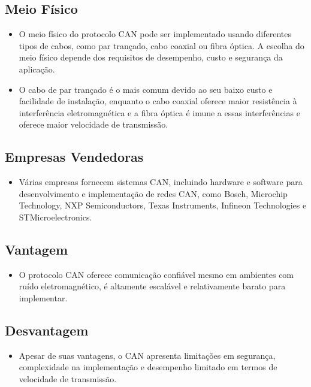 \documentclass[a4paper,11pt]{article} %
\begin{document}
\subsection{Meio Físico}
\begin{itemize}
    \item O meio físico do protocolo CAN pode ser implementado usando diferentes tipos de cabos, como par trançado, cabo coaxial ou fibra óptica. A escolha do meio físico depende dos requisitos de desempenho, custo e segurança da aplicação.
    \item O cabo de par trançado é o mais comum devido ao seu baixo custo e facilidade de instalação, enquanto o cabo coaxial oferece maior resistência à interferência eletromagnética e a fibra óptica é imune a essas interferências e oferece maior velocidade de transmissão.
\end{itemize}

\subsection{Empresas Vendedoras}
\begin{itemize}
    \item Várias empresas fornecem sistemas CAN, incluindo hardware e software para desenvolvimento e implementação de redes CAN, como Bosch, Microchip Technology, NXP Semiconductors, Texas Instruments, Infineon Technologies e STMicroelectronics.
\end{itemize}

\subsection{Vantagem}
\begin{itemize}
    \item O protocolo CAN oferece comunicação confiável mesmo em ambientes com ruído eletromagnético, é altamente escalável e relativamente barato para implementar.
\end{itemize}

\subsection{Desvantagem}
\begin{itemize}
    \item Apesar de suas vantagens, o CAN apresenta limitações em segurança, complexidade na implementação e desempenho limitado em termos de velocidade de transmissão.
\end{itemize}
\end{document}
